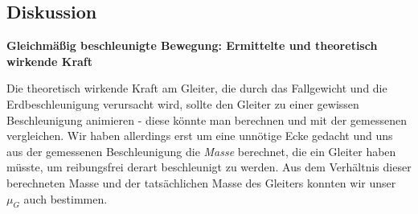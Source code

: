 \documentclass{article}
\begin{document}


\subsection{Diskussion}
\textbf{Gleichmäßig beschleunigte Bewegung: Ermittelte und theoretisch wirkende Kraft}

Die theoretisch wirkende Kraft am Gleiter, die durch das Fallgewicht und die Erdbeschleunigung verursacht wird, sollte den Gleiter zu einer gewissen Beschleunigung animieren - diese könnte man berechnen und mit der gemessenen vergleichen. Wir haben allerdings erst um eine unnötige Ecke gedacht und uns aus der gemessenen Beschleunigung die \textit{Masse} berechnet, die ein Gleiter haben müsste, um reibungsfrei derart beschleunigt zu werden. Aus dem Verhältnis dieser berechneten Masse und der tatsächlichen Masse des Gleiters konnten wir unser $\mu_G$ auch bestimmen. 
\end{document}
